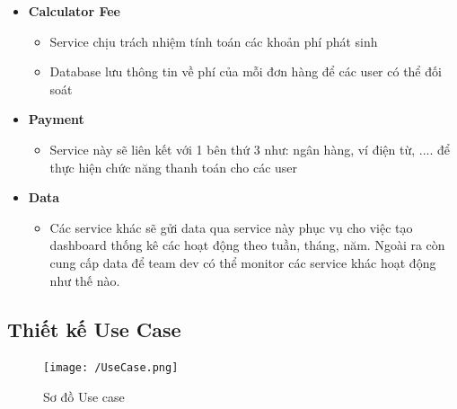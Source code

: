 \begin{itemize}
			\item \textbf{Calculator Fee}
			\begin{itemize}
				\item Service chịu trách nhiệm tính toán các khoản phí phát sinh
				\item Database lưu thông tin về phí của mỗi đơn hàng để các user có thể đối soát
			\end{itemize}
			\item \textbf{Payment}
			\begin{itemize}
				\item Service này sẽ liên kết với 1 bên thứ 3 như: ngân hàng, ví điện từ, .... để thực hiện chức năng thanh toán cho các user
			\end{itemize}
			\item \textbf{Data}
			\begin{itemize}
				\item Các service khác sẽ gửi data qua service này phục vụ cho việc tạo dashboard thống kê các hoạt động theo tuần, tháng, năm. Ngoài ra còn cung cấp data để team dev có thể monitor các service khác hoạt động như thế nào.
			\end{itemize}
		\end{itemize}


\subsection{Thiết kế Use Case}

\begin{figure}[!ht]
	\texttt{[image: /UseCase.png]}
	\centering
	\linebreak
	\caption{Sơ đồ Use case}
\end{figure}

